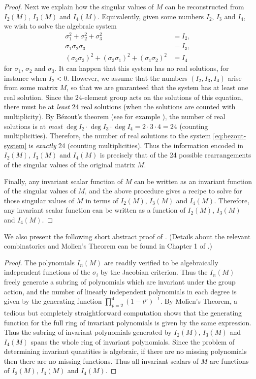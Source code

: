 \begin{proof}
Next we explain how the singular values of $M$ can be reconstructed from $I_{2}(M)$, $I_{3}(M)$ and $I_{4}(M)$. Equivalently, given some numbers $I_{2}$, $I_{3}$ and $I_{4}$, we wish to solve the algebraic system 
\begin{align}
\sigma_{1}^{2}+\sigma_{2}^{2}+\sigma_{3}^{2} & =I_{2},\nonumber \\
\sigma_{1}\sigma_{2}\sigma_{3} & =I_{3},\nonumber \\
\left(\sigma_{2}\sigma_{3}\right)^{2}+\left(\sigma_{3}\sigma_{1}\right)^{2}+\left(\sigma_{1}\sigma_{2}\right)^{2} & =I_{4}\label{eq:bezout-system}
\end{align}
 for $\sigma_{1}$, $\sigma_{2}$ and $\sigma_{3}$. It can happen that this system has no real solutions, for instance when $I_{2}<0$. However, we assume that the numbers $\left(I_{2},I_{3},I_{4}\right)$ arise from some matrix $M$, so that we are guaranteed that the system has at least one real solution. Since the $24$-element group acts on the solutions of this equation, there must be at \emph{least} 24 real solutions (when the solutions are counted with multiplicity). By B\'ezout's theorem (see for example \cite{shafarevich1994}), the number of real solutions is at \emph{most} $\deg I_{2}\cdot\deg I_{3}\cdot\deg I_{4}=2\cdot3\cdot4=24$ (counting multiplicities). Therefore, the number of real solutions to the system \eqref{eq:bezout-system} is \emph{exactly} 24 (counting multiplicities). Thus the information encoded in $I_{2}(M)$, $I_{3}(M)$ and $I_{4}(M)$ is precisely that of the 24 possible rearrangements of the singular values of the original matrix $M$. 

Finally, any invariant scalar function of $M$ can be written as an invariant function of the singular values of $M$, and the above procedure gives a recipe to solve for those singular values of $M$ in terms of $I_{2}(M)$, $I_{3}(M)$ and $I_{4}(M)$. Therefore, any invariant scalar function can be written as a function of $I_{2}(M)$, $I_{3}(M)$ and $I_{4}(M)$.
\end{proof}
We also present the following short abstract proof of . (Details about the relevant combinatorics and Molien's Theorem can be found in Chapter 1 of \cite{mukai2003}.)
\begin{proof}
The polynomials $I_{n}(M)$ are readily verified to be algebraically independent functions of the $\sigma_{i}$ by the Jacobian criterion. Thus the $I_{n}(M)$ freely generate a subring of polynomials which are invariant under the group action, and the number of linearly independent polynomials in each degree is given by the generating function $\prod_{p=2}^{4}(1-t^{p})^{-1}$. By Molien's Theorem, a tedious but completely straightforward computation shows that the generating function for the full ring of invariant polynomials is given by the same expression. Thus the subring of invariant polynomials generated by $I_{2}(M)$, $I_{3}(M)$ and $I_{4}(M)$ spans the whole ring of invariant polynomials. Since the problem of determining invariant quantities is algebraic, if there are no missing polynomials then there are no missing functions. Thus all invariant scalars of $M$ are functions of $I_{2}(M)$, $I_{3}(M)$ and $I_{4}(M)$. 
\end{proof}

